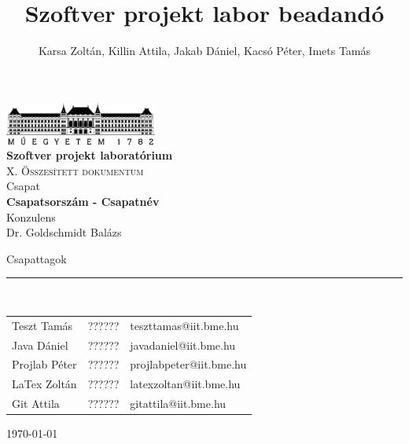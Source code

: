 \documentclass[12pt, a4paper]{book}
\title{Szoftver projekt labor beadandó}
\author{Karsa Zoltán, Killin Attila, Jakab Dániel, Kacsó Péter, Imets Tamás}
\begin{document}
\begin{titlepage} 
	\begin{center}
		\includegraphics[width=5cm]{doc/img/BMElogo}\\ 
		\vspace{1cm}
		\LARGE{\bfseries{Szoftver projekt laboratórium}}\\
		\vspace{0.5cm}
		\Large\textsc{X. Összesített dokumentum}\\
		\vspace{1cm}
		\small{Csapat}\\
		\Large{\bfseries{Csapatsorszám - Csapatnév}}\\
		\vspace{1cm}
		\small{Konzulens}\\
		\Large{Dr. Goldschmidt Balázs}
	\end{center}
	\begin{flushleft}
		\vspace*{6cm}
		Csapattagok\\
		\vspace{-0.3cm}
		\rule{14cm}{0.5pt}\\
		\vspace{0.2cm}
		\begin{tabular}{l l l} %
			Teszt Tamás & ?????? & teszttamas@iit.bme.hu \\
			Java Dániel & ?????? & javadaniel@iit.bme.hu \\
			Projlab Péter & ?????? & projlabpeter@iit.bme.hu \\
			LaTex Zoltán  & ?????? & latexzoltan@iit.bme.hu \\
			Git Attila & ?????? & gitattila@iit.bme.hu \\
		\end{tabular}
	\end{flushleft}
	\begin{flushright}
		\vspace*{2cm}
		\today   %
	\end{flushright}
\end{titlepage}

\sloppy

\end{document}
